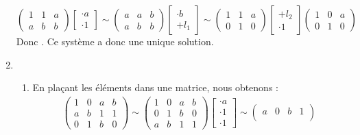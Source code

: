 \documentclass[10p,a4paper]{scrartcl}
\renewcommand{\(}{\left(}
\renewcommand{\)}{\right)}
\begin{document}
\begin{enumerate}
			\[\left(\begin{array}{cc|c}
				1 & 1 & a\\
				a & b & b
			\end{array}\right)
			\begin{bmatrix}
				\cdot a\\
				\cdot 1
			\end{bmatrix} \sim
			\left(\begin{array}{cc|c}
				a & a & b\\
				a & b & b
			\end{array}\right)
			\begin{bmatrix}
				\cdot b\\
				+l_1
			\end{bmatrix}\sim
			\left(\begin{array}{cc|c}
				1 & 1 & a\\
				0 & 1 & 0
			\end{array}\right)
			\begin{bmatrix}
				+l_2\\
				\cdot 1
			\end{bmatrix}
			\left(\begin{array}{cc|c}
				1 & 0 & a\\
				0 & 1 & 0
			\end{array}\right)\]
			Donc . Ce système a donc une unique solution.
	\item	\begin{enumerate}
				\item 	En plaçant les éléments dans une matrice, nous obtenons :
						\begin{align*}
							\begin{pmatrix}
							1 & 0 & a & b\\
							a & b & 1 & 1\\
							0 & 1 & b & 0
							\end{pmatrix}
							\sim
							\begin{pmatrix}
							1 & 0 & a & b\\
							0 & 1 & b & 0\\						
							a & b & 1 & 1
							\end{pmatrix}
							\begin{bmatrix}
							\cdot a\\
							\cdot 1\\
							\cdot 1
							\end{bmatrix}
							\sim
							\begin{pmatrix}
							a & 0 & b & 1\\

\end{pmatrix}
\end{align*}
\end{enumerate}
\end{enumerate}
\end{document}
